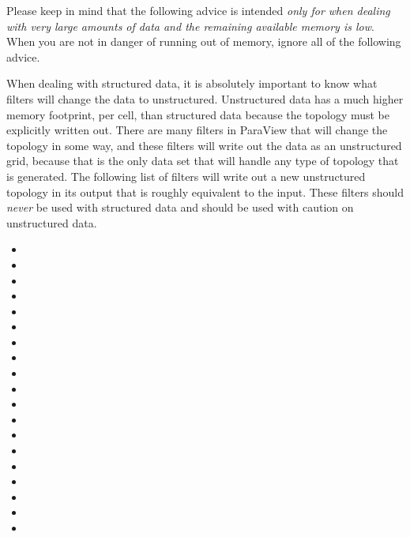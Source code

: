 Please keep in mind that the following advice is intended \emph{only for
  when dealing with very large amounts of data and the remaining available
  memory is low}.  When you are not in danger of running out of memory,
ignore all of the following advice.

When dealing with structured data, it is absolutely important to know what
filters will change the data to unstructured.  Unstructured data has a much
higher memory footprint, per cell, than structured data because the
topology must be explicitly written out.  There are many filters in
ParaView that will change the topology in some way, and these filters will
write out the data as an unstructured grid, because that is the only data
set that will handle any type of topology that is generated.  The following
list of filters will write out a new unstructured topology in its output
that is roughly equivalent to the input.  These filters should \emph{never}
be used with structured data and should be used with caution on
unstructured data.

\begin{multicols}{2}
  \begin{itemize}
  \item {}
  \item {}
  \item {}
  \item {}
  \item {}
  \item {}
  \item {}
  \item {}
  \item {}
  \item {}
  \item {}
  \item {}
  \item {}
  \item {}
  \item {}
  \item {}
  \item {}
  \item {}
  \item {}
  \end{itemize}
\end{multicols}

